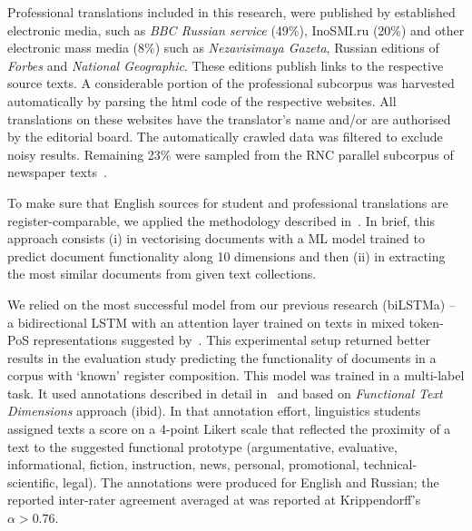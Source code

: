 Professional translations included in this research, were published by established electronic media, such as \textit{BBC Russian service}  (49\%), InoSMI.ru (20\%) and other electronic mass media (8\%) such as \textit{Nezavisimaya Gazeta}, Russian editions of \textit{Forbes} and \textit{National Geographic}. These editions publish links to the respective source texts. A considerable portion of the professional subcorpus was harvested automatically by parsing the html code of the respective websites. All translations on these websites have the translator's name and/or are authorised by the editorial board.
The automatically crawled data was filtered to exclude noisy results.
Remaining 23\% were sampled from the \gls{RNC} parallel subcorpus of newspaper texts~\cite{Sitchinava2019}. 

\label{pg:stu_pro_made_comparable}
To make sure that  English sources for student and professional translations are register-comparable, we applied the methodology described in~\citet{Kunilovskaya2019similar}. In brief, this approach consists (i) in vectorising documents with a ML model trained to predict document functionality along 10 dimensions and then (ii) in extracting the most similar documents from given text collections.

We relied on the most successful model from our previous research (biLSTMa) -- a bidirectional LSTM with an attention layer trained on texts in mixed token-PoS representations suggested by~\citet{Baroni2006}. This experimental setup returned better results in the evaluation study predicting the functionality of documents in a corpus with `known' register composition. 
This model was trained in a multi-label task. It used annotations described in detail in~\citet{Sharoff2018} and based on \textit{Functional Text Dimensions} approach (ibid). In that annotation effort, linguistics students assigned texts a score on a 4-point Likert scale that reflected the proximity of a text to the suggested functional prototype (argumentative, evaluative, informational, fiction, instruction, news, personal, promotional, technical-scientific, legal). The annotations were produced for English and Russian; the reported inter-rater agreement averaged at was reported at Krippendorff's $\alpha > 0.76$. 

